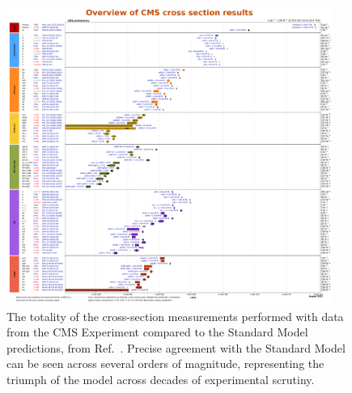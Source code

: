 \begin{figure}[htb]
    \centering
    \includegraphics[width=0.95\textwidth]{fig/cms/cms_xsecs_2023.pdf}
    \caption[The totality of the cross-section measurements performed with data from the CMS Experiment]{
        The totality of the cross-section measurements performed with data from the CMS Experiment compared to the Standard Model predictions, from Ref.~\cite{CMSXSecs}. 
        Precise agreement with the Standard Model can be seen across several orders of magnitude, representing the triumph of the model across decades of experimental scrutiny. 
    }
    \label{fig:cms_xsecs}
\end{figure}

